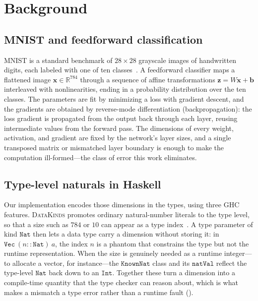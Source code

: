 \documentclass[sigconf,nonacm]{acmart}
\begin{document}
\section{Background}
\label{sec:background}

\subsection{MNIST and feedforward classification}
\label{sec:bg:mnist}

MNIST is a standard benchmark of $28\times28$ grayscale images of handwritten
digits, each labeled with one of ten classes~\cite{lecun-mnist}. A feedforward
classifier maps a flattened image $\mathbf{x}\in\mathbb{R}^{784}$ through a
sequence of affine transformations $\mathbf{z} = W\mathbf{x} + \mathbf{b}$
interleaved with nonlinearities, ending in a probability distribution over the
ten classes. The parameters are fit by minimizing a loss with gradient descent,
and the gradients are obtained by reverse-mode differentiation
(backpropagation): the loss gradient is propagated from the output back through
each layer, reusing intermediate values from the forward pass. The dimensions of
every weight, activation, and gradient are fixed by the network's layer sizes,
and a single transposed matrix or mismatched layer boundary is enough to make the
computation ill-formed---the class of error this work eliminates.

\subsection{Type-level naturals in Haskell}
\label{sec:bg:datakinds}

Our implementation encodes those dimensions in the types, using three GHC
features. \textsc{DataKinds} promotes ordinary natural-number literals to the
type level, so that a size such as $784$ or $10$ can appear as a type
index~\cite{datakinds}. A type parameter of kind $\mathtt{Nat}$ then lets a data
type carry a dimension without storing it: in $\mathtt{Vec}\ (n :: \mathtt{Nat})\
a$, the index $n$ is a phantom that constrains the type but not the runtime
representation. When the size is genuinely needed as a runtime integer---to
allocate a vector, for instance---the $\mathtt{KnownNat}$ class and its
$\mathtt{natVal}$ reflect the type-level $\mathtt{Nat}$ back down to an
$\mathtt{Int}$. Together these turn a dimension into a compile-time quantity that
the type checker can reason about, which is what makes a mismatch a type error
rather than a runtime fault (\Cref{sec:architecture}).
\end{document}
